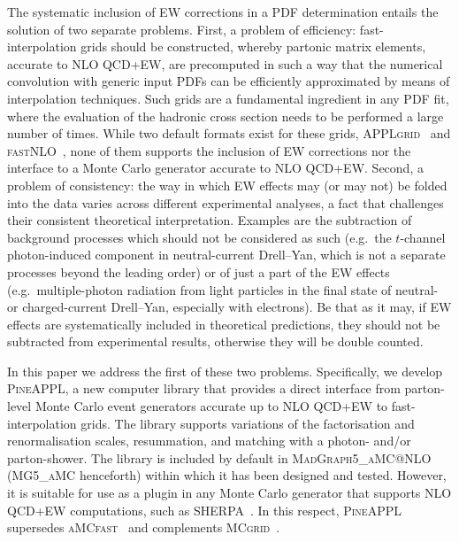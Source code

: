 The systematic inclusion of EW corrections in a PDF determination entails
the solution of two separate problems. First, a problem of efficiency:
fast-interpolation grids should be constructed, whereby partonic matrix 
elements, accurate to NLO QCD+EW, are precomputed in such a way that the 
numerical convolution with generic input PDFs can be efficiently approximated
by means of interpolation techniques. Such grids are a fundamental ingredient
in any PDF fit, where the evaluation of the hadronic cross section needs to 
be performed a large number of times. While two default formats exist for
these grids, \textsc{APPLgrid}~\cite{Carli:2010rw} and
\textsc{fastNLO}~\cite{Kluge:2006xs}, none of them supports the inclusion of EW
corrections nor the interface to a Monte Carlo generator accurate to 
NLO QCD+EW\@. Second, a problem of consistency: the way in which EW effects may
(or may not) be folded into the data varies across different experimental 
analyses, a fact that challenges their consistent theoretical interpretation. 
Examples are the subtraction of background processes which should not be 
considered as such (e.g.\ the $t$-channel photon-induced component in
neutral-current Drell--Yan, which is not a separate processes beyond the leading
order) or of just a part of the EW effects (e.g.\ multiple-photon
radiation from light particles in the final state of neutral- or charged-current
Drell--Yan, especially with electrons). Be that as it may, if EW effects are
systematically included in theoretical predictions, they should not be subtracted
from experimental results, otherwise they will be double counted.

In this paper we address the first of these two problems. Specifically, 
we develop \textsc{PineAPPL}, a new computer library that provides a direct interface
from parton-level Monte Carlo event generators accurate up to NLO QCD+EW to
fast-interpolation grids. The library supports variations of the factorisation
and renormalisation scales, resummation, and matching with a photon- and/or
parton-shower. The library is included by default in 
\textsc{MadGraph5\_aMC@NLO} (\textsc{MG5\_aMC} henceforth) within which it has
been designed and tested. However, it is suitable for use as a plugin in any 
Monte Carlo generator that supports NLO QCD+EW computations, such as 
\textsc{SHERPA}~\cite{Biedermann:2017yoi}. In this respect, \textsc{PineAPPL}
supersedes \textsc{aMCfast}~\cite{Bertone:2014zva} and complements
\textsc{MCgrid}~\cite{DelDebbio:2013kxa,Bothmann:2015dba}.

